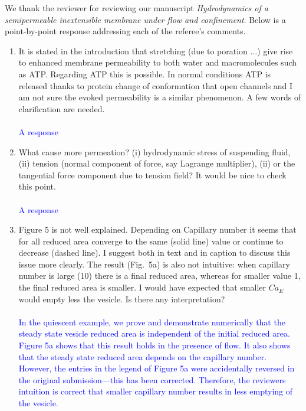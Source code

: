 \documentclass[11pt]{article}
\newcommand{\response}[1]{\textcolor{blue}{#1}}
\begin{document}
We thank the reviewer for reviewing our manuscript \textit{Hydrodynamics
of a semipermeable inextensible membrane under flow and confinement}.
Below is a point-by-point response addressing each of the referee's
comments.
\begin{enumerate}
  \item It is stated in the introduction that stretching (due to
    poration $\ldots$) give rise to enhanced membrane permeability to
    both water and macromolecules such as ATP. Regarding ATP this is
    possible. In normal conditions ATP is released thanks to protein
    change of conformation that open channels and I am not sure the
    evoked permeability is a similar phenomenon. A few words of
    clarification are needed. \\ \\
    \response{A response}

  \item What cause more permeation? (i) hydrodynamic stress of
    suspending fluid, (ii) tension (normal component of force, say
    Lagrange multiplier), (ii) or the tangential force component due to
    tension field? It would be nice to check this point. \\ \\
    \response{A response}

  \item Figure 5 is not well explained. Depending on Capillary number it
    seems that for all reduced area converge to the same (solid line)
    value or continue to decrease (dashed line). I suggest both in text
    and in caption to discuss this issue more clearly. The result
    (Fig.~5a) is also not intuitive: when capillary number is large (10)
    there is a final reduced area, whereas for smaller value 1, the
    final reduced area is smaller. I would have expected that smaller
    $Ca_E$ would empty less the vesicle. Is there any interpretation? \\
    \\
    \response{In the quiescent example, we prove and demonstrate
    numerically that the steady state vesicle reduced area is
    independent of the initial reduced area. Figure 5a shows that this
    result holds in the presence of flow. It also shows that the
    steady state reduced area depends on the capillary number. However,
    the entries in the legend of Figure 5a were accidentally reversed in
    the original submission---this has been corrected. Therefore, the
    reviewers intuition is correct that smaller capillary number results
    in less emptying of the vesicle.}


\end{enumerate}
\end{document}
